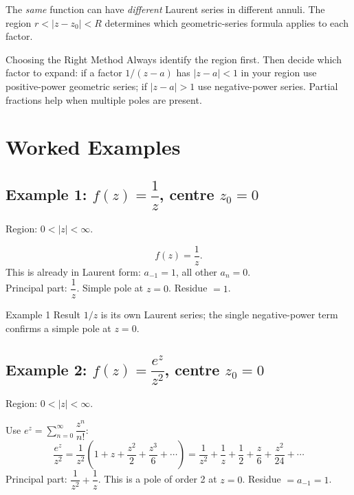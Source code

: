 \documentclass[12pt,a4paper]{article}
\begin{document}
The \emph{same} function can have \emph{different} Laurent series in different annuli. The
region $r < |z-z_0| < R$ determines which geometric-series formula applies to each factor.

\begin{learnbox}{Choosing the Right Method}
Always identify the region first. Then decide which factor to expand: if a factor $1/(z-a)$
has $|z-a|<1$ in your region use positive-power geometric series; if $|z-a|>1$ use
negative-power series. Partial fractions help when multiple poles are present.
\end{learnbox}

\section{Worked Examples}

\subsection*{Example 1: $f(z)=\dfrac{1}{z}$, centre $z_0=0$}

Region: $0 < |z| < \infty$.

\[
  f(z) = \frac{1}{z}.
\]
This is already in Laurent form: $a_{-1}=1$, all other $a_n=0$.\\
Principal part: $\dfrac{1}{z}$. Simple pole at $z=0$. Residue $= 1$.

\begin{learnbox}{Example 1 Result}
$1/z$ is its own Laurent series; the single negative-power term confirms a simple pole at $z=0$.
\end{learnbox}

\subsection*{Example 2: $f(z)=\dfrac{e^z}{z^2}$, centre $z_0=0$}

Region: $0 < |z| < \infty$.

Use $e^z = \sum_{n=0}^{\infty} \dfrac{z^n}{n!}$:
\[
  \frac{e^z}{z^2} = \frac{1}{z^2}\left(1 + z + \frac{z^2}{2}+\frac{z^3}{6}+\cdots\right)
  = \frac{1}{z^2} + \frac{1}{z} + \frac{1}{2} + \frac{z}{6} + \frac{z^2}{24} + \cdots
\]
Principal part: $\dfrac{1}{z^2}+\dfrac{1}{z}$. This is a pole of order 2 at $z=0$.
Residue $= a_{-1} = 1$.
\end{document}
